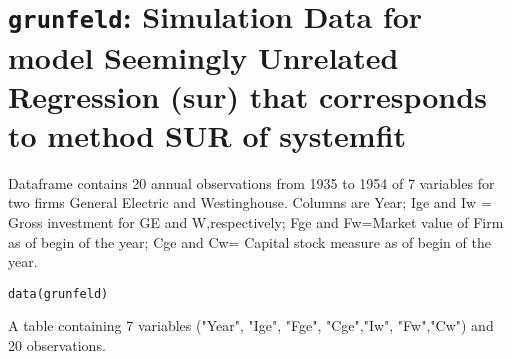  \section{{\tt grunfeld}: Simulation Data for model Seemingly Unrelated Regression (sur) that corresponds to method SUR of systemfit}\label{ss:grunfeld}
\begin{Description}\relax
Dataframe contains 20 annual observations from 1935 to
1954 of 7 variables for two firms General Electric  and Westinghouse.
Columns are Year; Ige and Iw = Gross investment for GE and
W,respectively; Fge and Fw=Market value of Firm as of
begin of the year; Cge and Cw= Capital stock measure as of begin of
the year.
\end{Description}
\begin{Usage}
\begin{verbatim}data(grunfeld)\end{verbatim}
\end{Usage}
\begin{Format}\relax
A table containing 7 variables ("Year", "Ige", "Fge", "Cge","Iw", "Fw","Cw")
and 20 observations.
\end{Format}


